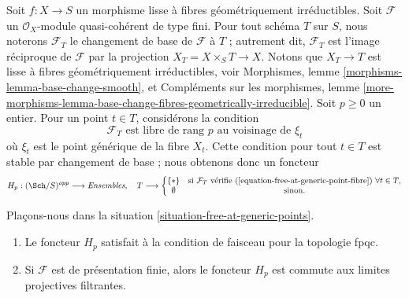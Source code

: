 \begin{situation}
\label{situation-free-at-generic-points}
Soit $f : X \to S$ un morphisme lisse à fibres géométriquement
irréductibles. Soit $\mathcal{F}$ un $\mathcal{O}_X$-module quasi-cohérent de
type fini. Pour tout schéma $T$ sur $S$, nous noterons
$\mathcal{F}_T$ le changement de base de $\mathcal{F}$ à $T$ ; autrement
dit, $\mathcal{F}_T$ est l'image réciproque de $\mathcal{F}$ par la
projection $X_T = X \times_S T \to X$. Notons que $X_T \to T$
est lisse à fibres géométriquement irréductibles, voir
Morphismes, lemme \ref{morphisms-lemma-base-change-smooth}, et
Compléments sur les morphismes,
lemme \ref{more-morphisms-lemma-base-change-fibres-geometrically-irreducible}.
Soit $p \geq 0$ un entier. Pour un point $t \in T$, considérons la
condition
\begin{equation}
\label{equation-free-at-generic-point-fibre}
\mathcal{F}_T \text{ est libre de rang }p\text{ au voisinage de }\xi_t
\end{equation}
où $\xi_t$ est le point générique de la fibre $X_t$. Cette condition
pour tout $t \in T$ est stable par changement de base ; nous obtenons donc un foncteur
\begin{equation}
\label{equation-free-at-generic-points}
H_p : (\Sch/S)^{opp} \longrightarrow \textit{Ensembles}, \quad
T \longrightarrow \left\{
\begin{matrix}
\{*\} & \text{si }\mathcal{F}_T\text{ vérifie
(\ref{equation-free-at-generic-point-fibre}) }\forall t\in T, \\
\emptyset & \text{sinon.}
\end{matrix}
\right.
\end{equation}
\end{situation}

\begin{lemma}
\label{lemma-free-at-generic-points}
Plaçons-nous dans la situation \ref{situation-free-at-generic-points}.
\begin{enumerate}
\item Le foncteur $H_p$ satisfait à la condition de faisceau pour la topologie fpqc.
\item Si $\mathcal{F}$ est de présentation finie, alors le foncteur $H_p$ est
commute aux limites projectives filtrantes.
\end{enumerate}
\end{lemma}

